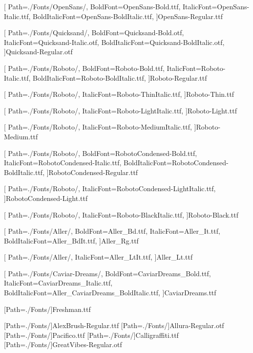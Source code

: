 
\newfontfamily{\opensans}[
Path=./Fonts/OpenSans/,
BoldFont=OpenSans-Bold.ttf,
ItalicFont=OpenSans-Italic.ttf,
BoldItalicFont=OpenSans-BoldItalic.ttf,
]{OpenSans-Regular.ttf}


\newfontfamily{\quicksand}[
Path=./Fonts/Quicksand/,
BoldFont=Quicksand-Bold.otf,
ItalicFont=Quicksand-Italic.otf,
BoldItalicFont=Quicksand-BoldItalic.otf,
]{Quicksand-Regular.otf}


\newfontfamily{\roboto}[
Path=./Fonts/Roboto/,
BoldFont=Roboto-Bold.ttf,
ItalicFont=Roboto-Italic.ttf,
BoldItalicFont=Roboto-BoldItalic.ttf,
]{Roboto-Regular.ttf}

\newfontfamily{\robotot}[
Path=./Fonts/Roboto/,
ItalicFont=Roboto-ThinItalic.ttf,
]{Roboto-Thin.ttf}

\newfontfamily{\robotol}[
Path=./Fonts/Roboto/,
ItalicFont=Roboto-LightItalic.ttf,
]{Roboto-Light.ttf}

\newfontfamily{\robotom}[
Path=./Fonts/Roboto/,
ItalicFont=Roboto-MediumItalic.ttf,
]{Roboto-Medium.ttf}


\newfontfamily{\robotoc}[
Path=./Fonts/Roboto/,
BoldFont=RobotoCondensed-Bold.ttf,
ItalicFont=RobotoCondensed-Italic.ttf,
BoldItalicFont=RobotoCondensed-BoldItalic.ttf,
]{RobotoCondensed-Regular.ttf}


\newfontfamily{\robotocl}[
Path=./Fonts/Roboto/,
ItalicFont=RobotoCondensed-LightItalic.ttf,
]{RobotoCondensed-Light.ttf}


\newfontfamily{\robotob}[
Path=./Fonts/Roboto/,
ItalicFont=Roboto-BlackItalic.ttf,
]{Roboto-Black.ttf}

\newfontfamily{\aller}[
Path=./Fonts/Aller/,
BoldFont=Aller_Bd.ttf,
ItalicFont=Aller_It.ttf,
BoldItalicFont=Aller_BdIt.ttf,
]{Aller_Rg.ttf}

\newfontfamily{\allerl}[
Path=./Fonts/Aller/,
ItalicFont=Aller_LtIt.ttf,
]{Aller_Lt.ttf}

\newfontfamily{\caviar}[
Path=./Fonts/Caviar-Dreams/,
BoldFont=CaviarDreams_Bold.ttf,
ItalicFont=CaviarDreams_Italic.ttf,
BoldItalicFont=Aller_CaviarDreams_BoldItalic.ttf,
]{CaviarDreams.ttf}



\newfontfamily{\michigan}[Path=./Fonts/]{Freshman.ttf}

\newfontfamily{\alexbrush}[Path=./Fonts/]{AlexBrush-Regular.ttf}
\newfontfamily{\allura}[Path=./Fonts/]{Allura-Regular.otf}
\newfontfamily{\pacifico}[Path=./Fonts/]{Pacifico.ttf}
\newfontfamily{\calligraffiti}[Path=./Fonts/]{Calligraffiti.ttf}
\newfontfamily{\greatvibes}[Path=./Fonts/]{GreatVibes-Regular.otf}